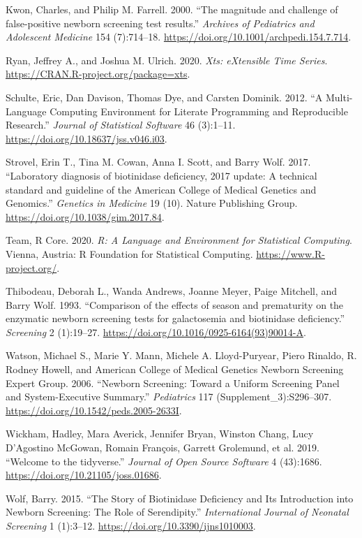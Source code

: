 \documentclass[review]{elsarticle}
\begin{document}
\begin{hangparas}{1.5em}{1}
\hypertarget{citeproc_bib_item_7}{Kwon, Charles, and Philip M. Farrell. 2000. “The magnitude and challenge of false-positive newborn screening test results.” \textit{Archives of Pediatrics and Adolescent Medicine} 154 (7):714–18. \href{https://doi.org/10.1001/archpedi.154.7.714}{https://doi.org/10.1001/archpedi.154.7.714}.}

\hypertarget{citeproc_bib_item_8}{Ryan, Jeffrey A., and Joshua M. Ulrich. 2020. \textit{Xts: eXtensible Time Series}. \href{https://CRAN.R-project.org/package=xts}{https://CRAN.R-project.org/package=xts}.}

\hypertarget{citeproc_bib_item_9}{Schulte, Eric, Dan Davison, Thomas Dye, and Carsten Dominik. 2012. “A Multi-Language Computing Environment for Literate Programming and Reproducible Research.” \textit{Journal of Statistical Software} 46 (3):1–11. \href{https://doi.org/10.18637/jss.v046.i03}{https://doi.org/10.18637/jss.v046.i03}.}

\hypertarget{citeproc_bib_item_10}{Strovel, Erin T., Tina M. Cowan, Anna I. Scott, and Barry Wolf. 2017. “Laboratory diagnosis of biotinidase deficiency, 2017 update: A technical standard and guideline of the American College of Medical Genetics and Genomics.” \textit{Genetics in Medicine} 19 (10). Nature Publishing Group. \href{https://doi.org/10.1038/gim.2017.84}{https://doi.org/10.1038/gim.2017.84}.}

\hypertarget{citeproc_bib_item_11}{Team, R Core. 2020. \textit{R: A Language and Environment for Statistical Computing}. Vienna, Austria: R Foundation for Statistical Computing. \href{https://www.R-project.org/}{https://www.R-project.org/}.}

\hypertarget{citeproc_bib_item_12}{Thibodeau, Deborah L., Wanda Andrews, Joanne Meyer, Paige Mitchell, and Barry Wolf. 1993. “Comparison of the effects of season and prematurity on the enzymatic newborn screening tests for galactosemia and biotinidase deficiency.” \textit{Screening} 2 (1):19–27. \href{https://doi.org/10.1016/0925-6164(93)90014-A}{https://doi.org/10.1016/0925-6164(93)90014-A}.}

\hypertarget{citeproc_bib_item_13}{Watson, Michael S., Marie Y. Mann, Michele A. Lloyd-Puryear, Piero Rinaldo, R. Rodney Howell, and American College of Medical Genetics Newborn Screening Expert Group. 2006. “Newborn Screening: Toward a Uniform Screening Panel and System-Executive Summary.” \textit{Pediatrics} 117 (Supplement\_3):S296–307. \href{https://doi.org/10.1542/peds.2005-2633I}{https://doi.org/10.1542/peds.2005-2633I}.}

\hypertarget{citeproc_bib_item_14}{Wickham, Hadley, Mara Averick, Jennifer Bryan, Winston Chang, Lucy D’Agostino McGowan, Romain François, Garrett Grolemund, et al. 2019. “Welcome to the tidyverse.” \textit{Journal of Open Source Software} 4 (43):1686. \href{https://doi.org/10.21105/joss.01686}{https://doi.org/10.21105/joss.01686}.}

\hypertarget{citeproc_bib_item_15}{Wolf, Barry. 2015. “The Story of Biotinidase Deficiency and Its Introduction into Newborn Screening: The Role of Serendipity.” \textit{International Journal of Neonatal Screening} 1 (1):3–12. \href{https://doi.org/10.3390/ijns1010003}{https://doi.org/10.3390/ijns1010003}.}
\end{hangparas}
\end{document}
